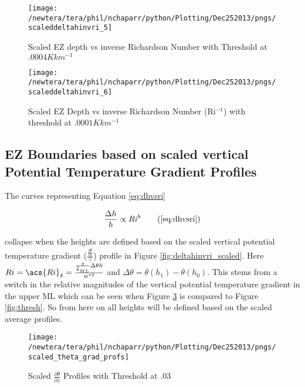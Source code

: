 \begin{figure}[htbp]
    \centering
    \texttt{[image: /newtera/tera/phil/nchaparr/python/Plotting/Dec252013/pngs/scaleddeltahinvri\_5]}
    \caption{Scaled EZ depth vs inverse Richardson Number with Threshold at $.0004Kkm^{-1}$}
    \label{fig:scaledeltahinvri1}   %
\end{figure}

\begin{figure}[htbp]
    \centering
    \texttt{[image: /newtera/tera/phil/nchaparr/python/Plotting/Dec252013/pngs/scaleddeltahinvri\_6]}
    \caption{Scaled EZ Depth vs inverse Richardson Number (\acs{Ri}$^{-1}$) with threshold at $.0001Kkm^{-1}$}
    \label{fig:scaledeltahinvri2}   %
\end{figure}

\clearpage
\subsection{\acs{EZ} Boundaries based on scaled vertical Potential Temperature Gradient Profiles}
\label{subsec:ellimscaledprof}

The curves representing Equation \ref{eq:dhvsri} 

\begin{equation}
\frac{\Delta h}{h} \propto Ri^{b} \tag{\ref{eq:dhvsri}}
\end{equation}

collapse when the heights are defined based on the scaled vertical potential temperature gradient 
($\frac{\frac{\partial \overline{\theta}}{\partial z}}{\gamma}$) profile in Figure \ref{fig:deltahinvri_scaled}.  Here $Ri = \acs{Ri}_{\delta}=\frac{\frac{g}{\overline{\theta}_{ML}} \Delta \theta h}{w^{*2}}$ and $\Delta \theta = \overline{\theta}(h_{1}) - \overline{\theta}(h_{0})$.  This stems
from a switch in the relative magnitudes of the vertical potential temperature gradient in the upper \acs{ML} which can be seen when Figure \ref{fig:thresh3} is compared to Figure \ref{fig:thresh}. So from here on all heights will be defined based on the scaled average profiles.   
\\

\begin{figure}[htbp]
    \centering
    \texttt{[image: /newtera/tera/phil/nchaparr/python/Plotting/Dec252013/pngs/scaled\_theta\_grad\_profs]}
    \caption{Scaled $\frac{\partial \overline{\theta}}{\partial z}$ Profiles with Threshold at .03}
    \label{fig:thresh3}   %
\end{figure}

